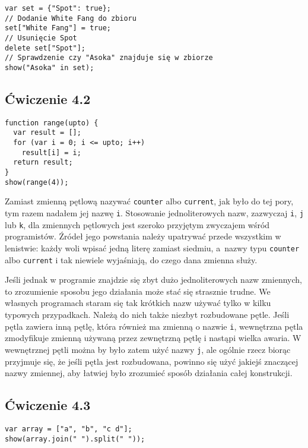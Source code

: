 \begin{verbatim} 
var set = {"Spot": true};
// Dodanie White Fang do zbioru
set["White Fang"] = true;
// Usunięcie Spot
delete set["Spot"];
// Sprawdzenie czy "Asoka" znajduje się w zbiorze
show("Asoka" in set);
 \end{verbatim}
    
  
\subsection*{Ćwiczenie 4.2}
\label{sol:4.2}
      
\begin{verbatim} 
function range(upto) {
  var result = [];
  for (var i = 0; i <= upto; i++)
    result[i] = i;
  return result;
}
show(range(4));
 \end{verbatim}
      
Zamiast zmienną pętlową nazywać \texttt{counter} albo \texttt{current}, jak było do tej pory, tym razem nadałem jej nazwę \texttt{i}. Stosowanie jednoliterowych nazw, zazwyczaj \texttt{i}, \texttt{j} lub \texttt{k}, dla zmiennych pętlowych jest szeroko przyjętym zwyczajem wśród programistów. Źródeł jego powstania należy upatrywać przede wszystkim w lenistwie: każdy woli wpisać jedną literę zamiast siedmiu, a~nazwy typu \texttt{counter} albo \texttt{current} i tak niewiele wyjaśniają, do czego dana zmienna służy.

      
Jeśli jednak w programie znajdzie się zbyt dużo jednoliterowych nazw zmiennych, to zrozumienie sposobu jego działania może stać się strasznie trudne. We własnych programach staram się tak krótkich nazw używać tylko w kilku typowych przypadkach. Należą do nich także niezbyt rozbudowane pętle. Jeśli pętla zawiera inną pętlę, która również ma zmienną o nazwie \texttt{i}, wewnętrzna pętla zmodyfikuje zmienną używaną przez zewnętrzną pętlę i nastąpi wielka awaria. W wewnętrznej pętli można by było zatem użyć nazwy \texttt{j}, ale ogólnie rzecz biorąc przyjmuje się, że jeśli pętla jest rozbudowana, powinno się użyć jakiejś znaczącej nazwy zmiennej, aby łatwiej było zrozumieć sposób działania całej konstrukcji.


\subsection*{Ćwiczenie 4.3}
\label{sol:4.3}
         
\begin{verbatim} 
var array = ["a", "b", "c d"];
show(array.join(" ").split(" "));
\end{verbatim}
   

